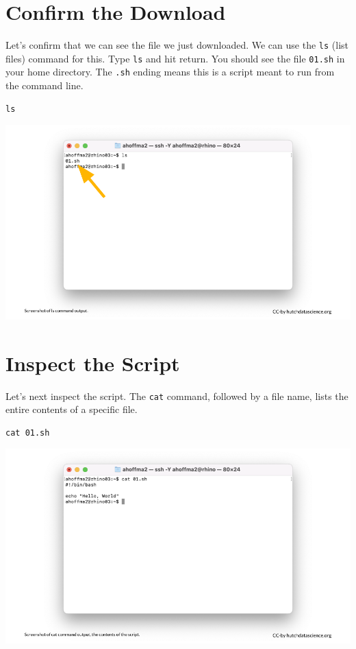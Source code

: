 \documentclass[
]{book}
\begin{document}
\hypertarget{confirm-the-download}{%
\section{Confirm the Download}\label{confirm-the-download}}

Let's confirm that we can see the file we just downloaded. We can use the \texttt{ls} (list files) command for this. Type \texttt{ls} and hit return. You should see the file \texttt{01.sh} in your home directory. The \texttt{.sh} ending means this is a script meant to run from the command line.

\begin{verbatim}
ls
\end{verbatim}

\includegraphics[width=1\linewidth]{resources/images/05-first-job_files/figure-latex//1BQxrVYdKZTbpCaF-i_q9w7s9x034lEXpQZDU-Sl09cs_g1579ffd7b01_0_6}

\hypertarget{inspect-the-script}{%
\section{Inspect the Script}\label{inspect-the-script}}

Let's next inspect the script. The \texttt{cat} command, followed by a file name, lists the entire contents of a specific file.

\begin{verbatim}
cat 01.sh
\end{verbatim}

\includegraphics[width=1\linewidth]{resources/images/05-first-job_files/figure-latex//1BQxrVYdKZTbpCaF-i_q9w7s9x034lEXpQZDU-Sl09cs_g1579ffd7b01_12_2}
\end{document}
